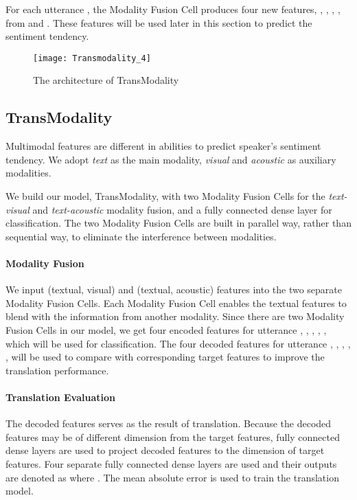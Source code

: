 \documentclass[sigconf]{acmart}
\begin{document}
	For each utterance , the Modality Fusion Cell produces four new features, , , , , from  and . These features will be used later in this section to predict the sentiment tendency.
	\begin{figure}[t]
		\centering
		\texttt{[image: Transmodality\_4]}
		\caption{The architecture of TransModality}
		\label{fig:transmodality}
	\end{figure}

	\subsection{TransModality}
	Multimodal features are different in abilities to predict speaker's sentiment tendency. We adopt \textit{text} as the main modality, \textit{visual} and \textit{acoustic} as auxiliary modalities.
	
	We build our model, TransModality, with two Modality Fusion Cells for the \textit{text-visual} and \textit{text-acoustic} modality fusion, and a fully connected dense layer for classification. The two Modality Fusion Cells are built in parallel way, rather than sequential way, to eliminate the interference between modalities.
	
	\paragraph{Modality Fusion}
	We input (textual, visual) and (textual, acoustic) features into the two separate Modality Fusion Cells. Each Modality Fusion Cell enables the textual features to blend with the information from another modality. Since there are two Modality Fusion Cells in our model, we get four encoded features for utterance , , , , , which will be used for classification. The four decoded features for utterance , , , , , will be used to compare with corresponding target features to improve the translation performance.
	
	\paragraph{Translation Evaluation}
	The decoded features serves as the result of translation. Because the decoded features may be of different dimension from the target features, fully connected dense layers are used to project decoded features to the dimension of target features. Four separate fully connected dense layers are used and their outputs are denoted as  where . The mean absolute error is used to train the translation model.
	
\end{document}
